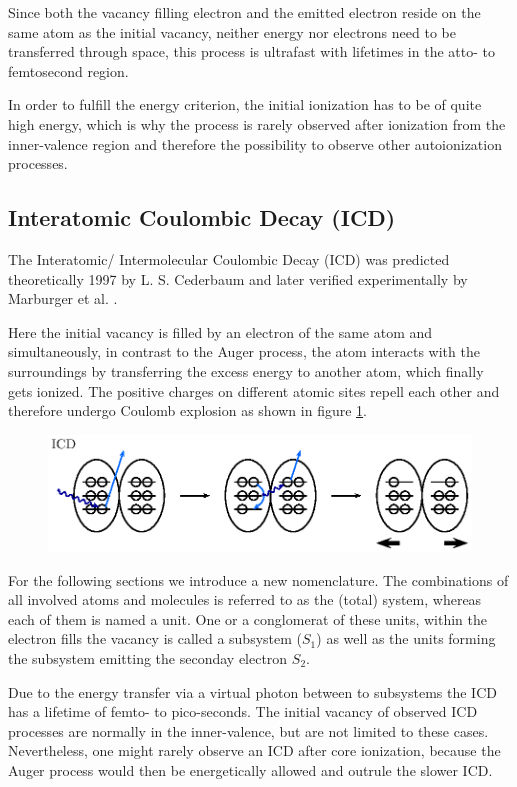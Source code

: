 Since both the vacancy filling electron and the emitted electron reside
on the same atom as the initial vacancy, neither energy nor electrons need
to be transferred through space, this process is ultrafast with lifetimes
in the atto- to femtosecond region.

In order to fulfill the energy criterion, the initial ionization has to
be of quite high energy, which is why the process is rarely observed after
ionization from the inner-valence region and therefore the possibility to
observe other autoionization processes.

\subsection{Interatomic Coulombic Decay (ICD)}
The Interatomic/ Intermolecular Coulombic Decay (ICD) was predicted
theoretically 1997 by L. S. Cederbaum \cite{Cederbaum97}
and later verified experimentally by Marburger et al. \cite{Marbuger03}.

Here the initial vacancy is filled by an electron of the same atom and simultaneously,
in contrast to the Auger process, the atom interacts with the surroundings by
transferring the excess energy to another atom, which finally gets ionized. The
positive charges on different atomic sites repell each other and therefore undergo
Coulomb explosion as shown in figure \ref{figure:icd_process}.

\begin{figure}[h]
 \centering
 \includegraphics{pics/icd-pspic.eps}
 \caption{}
 \label{figure:icd_process}
\end{figure}

For the following sections we introduce a new nomenclature. The combinations
of all involved atoms and molecules is referred to as the (total) system, whereas
each of them is named a unit. One or a conglomerat of these units, within
the electron fills the vacancy is called a subsystem ($S_1$) as well as the units
forming the 
subsystem emitting the seconday electron $S_2$.

Due to the energy transfer via a virtual photon between to subsystems
the ICD has a lifetime of femto- to pico-seconds.
The initial vacancy of observed ICD processes are normally in the inner-valence,
but are not limited to these cases. Nevertheless, one might rarely observe
an ICD after core ionization, because the Auger process would then be energetically
allowed and outrule the slower ICD.



